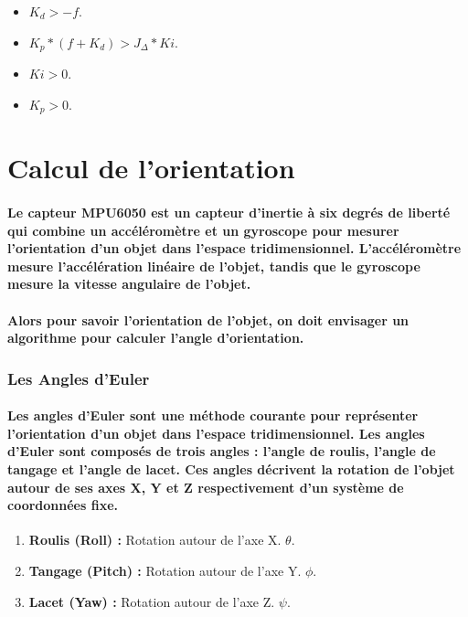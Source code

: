 \begin{itemize}
	\item $K_d > -f$.
	\item $K_p * (f + K_d) > J_\Delta * Ki$.
	\item $Ki > 0$.
	\item $K_p > 0$.
\end{itemize}


\section{Calcul de l'orientation}

\paragraph{Le capteur MPU6050 est un capteur d'inertie à six degrés de liberté qui combine un accéléromètre et un gyroscope pour mesurer l'orientation d'un objet dans l'espace tridimensionnel. L'accéléromètre mesure l'accélération linéaire de l'objet, tandis que le gyroscope mesure la vitesse angulaire de l'objet.}

\paragraph{Alors pour savoir l'orientation de l'objet, on doit envisager un algorithme pour calculer l'angle d'orientation.}

\subsubsection{Les Angles d'Euler}

\paragraph{Les angles d'Euler sont une méthode courante pour représenter l'orientation d'un objet dans l'espace tridimensionnel. Les angles d'Euler sont composés de trois angles : l'angle de roulis, l'angle de tangage et l'angle de lacet. Ces angles décrivent la rotation de l'objet autour de ses axes X, Y et Z respectivement d'un système de coordonnées fixe.}

\begin{enumerate}
	\item \textbf{Roulis (Roll) :} Rotation autour de l'axe X. $\theta$.
	\item \textbf{Tangage (Pitch) :} Rotation autour de l'axe Y. $\phi$.
	\item \textbf{Lacet (Yaw) :} Rotation autour de l'axe Z. $\psi$.
\end{enumerate}


